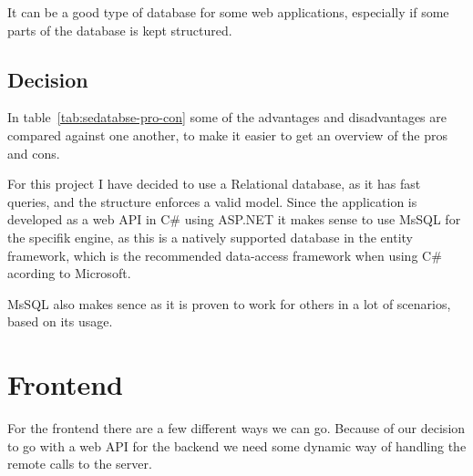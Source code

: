It can be a good type of database for some web applications, especially if some parts of the database is kept structured.


\subsection{Decision }
\label{sub:database_decision}
In table~\ref{tab:sedatabse-pro-con} some of the advantages and disadvantages are compared against one another, to make it easier to get an overview of the pros and cons.

For this project I have decided to use a Relational database, as it has fast queries, and the structure enforces a valid model. Since the application is developed as a web API in C\# using ASP.NET it makes sense to use MsSQL for the specifik engine, as this is a natively supported database in the entity framework, which is the recommended data-access framework when using C\# acording to Microsoft\cite{entity:microsoft}.

MsSQL also makes sence as it is proven to work for others in a lot of scenarios, based on its usage\cite{obdms:gartner}.

\begin{table}[h]
  \caption{Pros and cons of different types of databases}
  \label{tab:sedatabse-pro-con}
\end{table}

\section{Frontend}
\label{sec:Frontend}
For the frontend there are a few different ways we can go. Because of our decision to go with a web API for the backend we need some dynamic way of handling the remote calls to the server.

